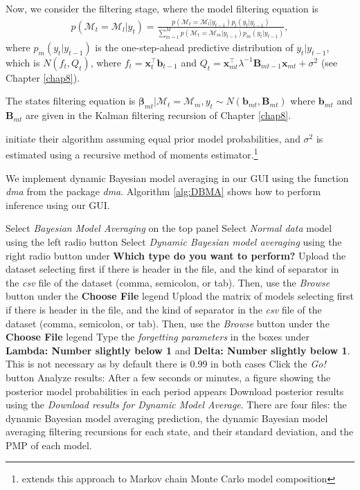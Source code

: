Now, we consider the filtering stage, where the model filtering equation is 
\begin{align*}
	p(\mathcal{M}_t=\mathcal{M}_l|y_{t})=\frac{p(\mathcal{M}_t=\mathcal{M}_l|y_{t-1})p_l(y_t|y_{t-1})}{\sum_{m=1}^M p(\mathcal{M}_t=\mathcal{M}_m|y_{t-1})p_m(y_t|y_{t-1})},
\end{align*}
where $p_m(y_t|y_{t-1})$ is the one-step-ahead predictive distribution of $y_t|{y}_{t-1}$, which is $N(f_t,Q_t)$, where $f_t=\bm{x}_t^{\top}\bm{b}_{t-1}$ and $Q_t=\bm{x}_{mt}^{\top}\lambda^{-1}\bm{B}_{mt-1}\bm{x}_{mt}+\sigma^2$ (see Chapter \ref{chap8}).

The states filtering equation is $\bm{\beta}_{mt}|\mathcal{M}_{t}=\mathcal{M}_{m},y_{t}\sim N(\bm{b}_{mt},\bm{B}_{mt})$ where $\bm{b}_{mt}$ and $\bm{B}_{mt}$ are given in the Kalman filtering recursion of Chapter \ref{chap8}.

\cite{raftery2010online} initiate their algorithm assuming equal prior model probabilities, and $\sigma^2$ is estimated using a recursive method of moments estimator.\footnote{\cite{ramirez2020dynamic} extends this approach to Markov chain Monte Carlo model composition}

We implement dynamic Bayesian model averaging in our GUI using the function \textit{dma} from the package \textit{dma}. Algorithm \ref{alg:DBMA} shows how to perform inference using our GUI.

\begin{algorithm}[h!]
	\caption{Dynamic Bayesian model averaging}\label{alg:DBMA}
	\begin{algorithmic}[1]  		 			
		\State Select \textit{Bayesian Model Averaging} on the top panel
		\State Select \textit{Normal data} model using the left radio button
		\State Select \textit{Dynamic Bayesian model averaging} using the right radio button under \textbf{Which type do you want to perform?}
		\State Upload the dataset selecting first if there is header in the file, and the kind of separator in the \textit{csv} file of the dataset (comma, semicolon, or tab). Then, use the \textit{Browse} button under the \textbf{Choose File} legend
		\State Upload the matrix of models selecting first if there is header in the file, and the kind of separator in the \textit{csv} file of the dataset (comma, semicolon, or tab). Then, use the \textit{Browse} button under the \textbf{Choose File} legend
		\State Type the \textit{forgetting parameters} in the boxes under \textbf{Lambda: Number slightly below 1} and \textbf{Delta: Number slightly below 1}. This is not necessary as by default there is 0.99 in both cases  
		\State Click the \textit{Go!} button
		\State Analyze results: After a few seconds or minutes, a figure showing the posterior model probabilities in each period appears
		\State Download posterior results using the \textit{Download results for Dynamic Model Average}. There are four files: the dynamic Bayesian model averaging prediction, the dynamic Bayesian model averaging filtering recursions for each state, and their standard deviation, and the PMP of each model. 
	\end{algorithmic} 
\end{algorithm}

